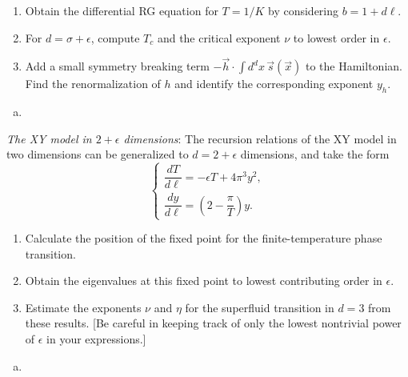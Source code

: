 \begin{problem}
\begin{enumerate}
        \item[(f)] Obtain the differential RG equation for $T = 1/K$ by considering $b = 1 + d\ell$.

        \item[(g)] For $d = \sigma + \epsilon$, compute $T_c$ and the critical exponent $\nu$ to lowest order in $\epsilon$.

        \item[(h)] Add a small symmetry breaking term $-\vec{h}\cdot\int d^dx\,\vec{s}(\vec{x})$ to the Hamiltonian. Find the renormalization of $h$ and identify the corresponding exponent $y_h$.
    \end{enumerate}
\end{problem}

\begin{solution}
    \begin{enumerate}[(a)]
        \item
    \end{enumerate}
\end{solution}

\begin{problem}
    \textit{The XY model in $2+\epsilon$ dimensions}: The recursion relations of the XY model in two dimensions can be generalized to $d = 2 + \epsilon$ dimensions, and take the form
    \[
        \begin{cases}
            \dfrac{dT}{d\ell} = -\epsilon T + 4\pi^3 y^2, \\[6pt]
            \dfrac{dy}{d\ell} = \left(2 - \dfrac{\pi}{T}\right)y.
        \end{cases}
    \]

    \begin{enumerate}
        \item[(a)] Calculate the position of the fixed point for the finite-temperature phase transition.

        \item[(b)] Obtain the eigenvalues at this fixed point to lowest contributing order in $\epsilon$.

        \item[(c)] Estimate the exponents $\nu$ and $\eta$ for the superfluid transition in $d = 3$ from these results. [Be careful in keeping track of only the lowest nontrivial power of $\epsilon$ in your expressions.]
    \end{enumerate}
\end{problem}

\begin{solution}
    \begin{enumerate}[(a)]
        \item
    \end{enumerate}
\end{solution}


